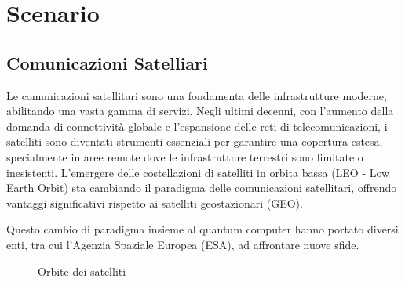 
\chapter{Scenario} %

\label{Chapter3} %



\section{Comunicazioni Satelliari}

Le comunicazioni satellitari sono una fondamenta delle infrastrutture moderne, abilitando una vasta gamma di servizi.
Negli ultimi decenni, con l'aumento della domanda di connettività globale e l'espansione delle reti di telecomunicazioni, i satelliti sono diventati strumenti essenziali per garantire una copertura estesa, specialmente in aree remote dove le infrastrutture terrestri sono limitate o inesistenti.
L'emergere delle costellazioni di satelliti in orbita bassa (LEO - Low Earth Orbit) sta cambiando il paradigma delle comunicazioni satellitari, offrendo vantaggi significativi rispetto ai satelliti geostazionari (GEO). 

Questo cambio di paradigma insieme al quantum computer hanno portato diversi enti, tra cui l'Agenzia Spaziale Europea (ESA), ad affrontare nuove sfide.

\begin{figure}[h!]
    \centering
    \caption{Orbite dei satelliti}
    \label{fig:orbite}
\end{figure}

